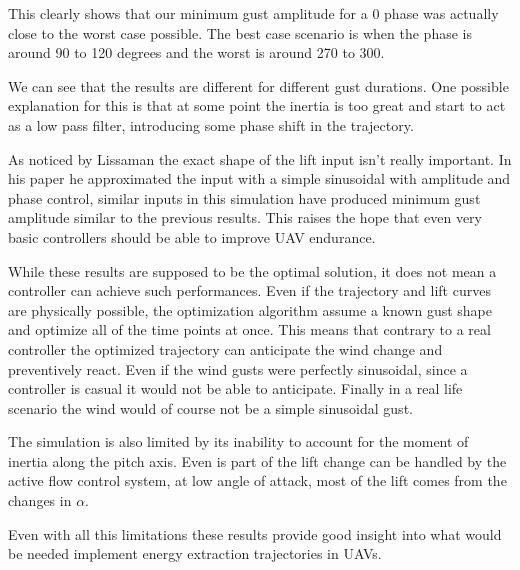 \par This clearly shows that our minimum gust amplitude for a 0 phase was actually close to the worst case possible.
The best case scenario is when the phase is around 90 to 120 degrees and the worst is around 270 to 300.

\FloatBarrier

\par We can see that the results are different for different gust durations.
One possible explanation for this is that at some point the inertia is too great and start to act as a low pass filter, introducing some phase shift in the trajectory. 




As noticed by Lissaman the exact shape of the lift input isn't really important.
In his paper he approximated the input with a simple sinusoidal with amplitude and phase control, similar inputs in this simulation have produced minimum gust amplitude similar to the previous results.
This raises the hope that even very basic controllers should be able to improve UAV endurance.


\par While these results are supposed to be the optimal solution, it does not mean a controller can achieve such performances.
Even if the trajectory and lift curves are physically possible, the optimization algorithm assume a known gust shape and optimize all of the time points at once.
This means that contrary to a real controller the optimized trajectory can anticipate the wind change and preventively react.
Even if the wind gusts were perfectly sinusoidal, since a controller is casual it would not be able to anticipate.
Finally in a real life scenario the wind would of course not be a simple sinusoidal gust.

\par The simulation is also limited by its inability to account for the moment of inertia along the pitch axis.
Even is part of the lift change can be handled by the active flow control system, at low angle of attack, most of the lift comes from the changes in $\alpha$.

\par Even with all this limitations these results provide good insight into what would be needed implement energy extraction trajectories in UAVs.


